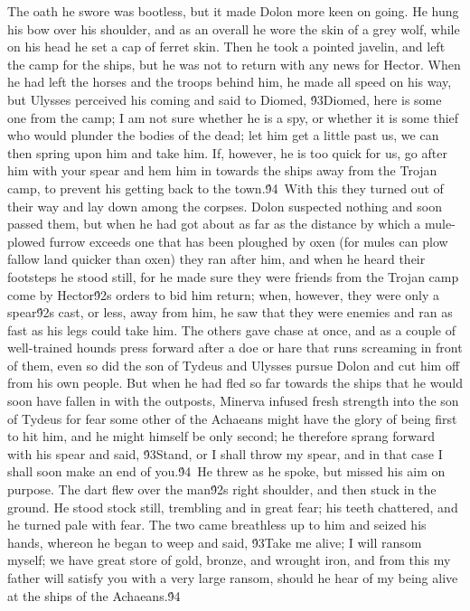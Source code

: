 {The oath he swore was bootless, but it made Dolon more keen on going. He hung his bow over his shoulder, and as an overall he wore the skin of a grey wolf, while on his head he set a cap of ferret skin. Then he took a pointed javelin, and left the camp for the ships, but he was not to return with any news for Hector. When he had left the horses and the troops behind him, he made all speed on his way, but Ulysses perceived his coming and said to Diomed, \'93Diomed, here is some one from the camp; I am not sure whether he is a spy, or whether it is some thief who would plunder the bodies of the dead; let him get a little past us, we can then spring upon him and take him. If, however, he is too quick for us, go after him with your spear and hem him in towards the ships away from the Trojan camp, to prevent his getting back to the town.\'94\
With this they turned out of their way and lay down among the corpses. Dolon suspected nothing and soon passed them, but when he had got about as far as the distance by which a mule-plowed furrow exceeds one that has been ploughed by oxen (for mules can plow fallow land quicker than oxen) they ran after him, and when he heard their footsteps he stood still, for he made sure they were friends from the Trojan camp come by Hector\'92s orders to bid him return; when, however, they were only a spear\'92s cast, or less, away from him, he saw that they were enemies and ran as fast as his legs could take him. The others gave chase at once, and as a couple of well-trained hounds press forward after a doe or hare that runs screaming in front of them, even so did the son of Tydeus and Ulysses pursue Dolon and cut him off from his own people. But when he had fled so far towards the ships that he would soon have fallen in with the outposts, Minerva infused fresh strength into the son of Tydeus for fear some other of the Achaeans might have the glory of being first to hit him, and he might himself be only second; he therefore sprang forward with his spear and said, \'93Stand, or I shall throw my spear, and in that case I shall soon make an end of you.\'94\
He threw as he spoke, but missed his aim on purpose. The dart flew over the man\'92s right shoulder, and then stuck in the ground. He stood stock still, trembling and in great fear; his teeth chattered, and he turned pale with fear. The two came breathless up to him and seized his hands, whereon he began to weep and said, \'93Take me alive; I will ransom myself; we have great store of gold, bronze, and wrought iron, and from this my father will satisfy you with a very large ransom, should he hear of my being alive at the ships of the Achaeans.\'94\
}
